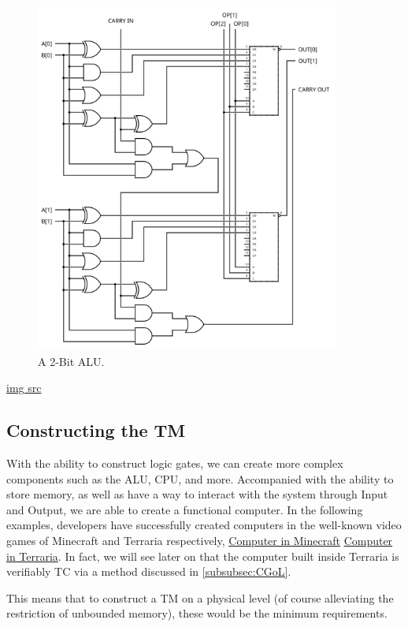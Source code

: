\begin{figure}[htb]
    \centering
    \includegraphics[width=10cm]{Images/2-bit_ALU.svg.png}
       \caption{A 2-Bit ALU.}
           \label{Fig:2BitALU}
\end{figure}

\href{https://en.wikibooks.org/wiki/File:2-bit_ALU.svg}{img src}

\subsection{Constructing the TM}\label{subsec:CreateTM}

With the ability to construct logic gates, we can create more complex components such as the ALU, CPU, and more.
Accompanied with the ability to store memory, as well as have a way to interact with the system through Input and Output, we are able to create a functional computer.
In the following examples, developers have successfully created computers in the well-known video games of Minecraft and Terraria respectively,
\href{https://www.youtube.com/watch?v=CW9N6kGbu2I}{Computer in Minecraft}
\href{https://www.youtube.com/watch?v=zXPiqk0-zDY}{Computer in Terraria}.
In fact, we will see later on that the computer built inside Terraria is verifiably TC via a method discussed in \ref{subsubsec:CGoL}.

This means that to construct a TM on a physical level (of course alleviating the restriction of unbounded memory), these would be the minimum requirements.

